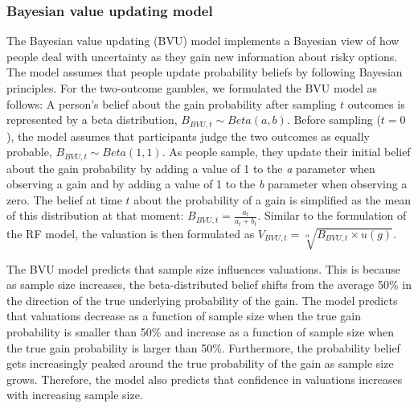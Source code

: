 \documentclass[a4paper,man, natbib]{apa6} %
\begin{document}
\subsubsection{Bayesian value updating model}
The Bayesian value updating (BVU) model implements a Bayesian view of how people deal with uncertainty as they gain new information about risky options. The model assumes that people update probability beliefs by following Bayesian principles. %
For the two-outcome gambles, we formulated the BVU model as follows: A person's belief about the gain probability after sampling $t$ outcomes is represented by a beta distribution, ${B}_{BVU, t} \sim Beta(a,b)$. Before sampling ($t = 0$), the model assumes that participants judge the two outcomes as equally probable, ${B}_{BVU, t} \sim Beta(1,1)$. As people sample, they update their initial belief about the gain probability by adding a value of 1 to the \textit{a} parameter when observing a gain and by adding a value of 1 to the \textit{b} parameter when observing a zero. The belief at time $t$ about the probability of a gain is simplified as the mean of this distribution at that moment: ${B}_{BVU, t} = \frac{a_{t}}{a_{t} + b_{t}}$. Similar to the formulation of the RF model, the valuation is then formulated as $V_{BVU, t} = \sqrt[\alpha]{{B}_{BVU, t} \times u({g})}$.

The BVU model predicts that sample size influences valuations. This is because as sample size increases, the beta-distributed belief shifts from the average 50\% in the direction of the true underlying probability of the gain. The model predicts that valuations decrease as a function of sample size when the true gain probability is smaller than 50\% and increase as a function of sample size when the true gain probability is larger than 50\%. Furthermore, the probability belief gets increasingly peaked around the true probability of the gain as sample size grows. Therefore, the model also predicts that confidence in valuations increases with increasing sample size. %
\end{document}
